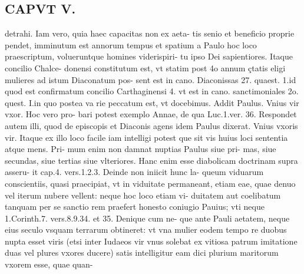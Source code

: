 \documentclass{article}
\begin{document}
\begin{pages}
\section*{CAPVT  V. }
\marginpar{[ p.27 ]}\pstart detrahi. Iam vero, quia haec capacitas non ex aeta- tis senio et beneficio proprie pendet, imminutum est annorum tempus et spatium a Paulo hoc loco praescriptum, volueruntque homines viderispiri- tu ipso Dei sapientiores. Itaque concilio Chalce- donensi constitutum est, vt statim post 4o annum çtatis eligi mulieres ad istum Diaconatum pos- sent est in cano. Diaconissas 27. quaest. 1.id quod est confirmatum concilio Carthaginensi 4. vt est in cano. sanctimoniales 2o. quest. I.in quo postea va rie peccatum est, vt docebimus. Addit Paulus. Vnius vir vxor. Hoc vero pro- bari potest exemplo Annae, de qua Luc.1.ver. 36. Respondet autem illi, quod de episcopis et Diaconis agens idem Paulus dixerat. Vnius vxoris vir. Itaque ex illo loco facile iam intelligi potest que sit vis huius loci sententia atque mens. Pri- mum enim non damnat nuptias Paulus siue pri- mas, siue secundas, siue tertias siue vlteriores. Hanc enim esse diabolicam doctrinam supra asseru- it cap.4. vers.1.2.3. Deinde non iniicit hunc la- queum viduarum conscientiis, quasi praecipiat, vt in viduitate permaneant, etiam eae, quae denuo vel iterum nubere vellent: neque hoc loco etiam vi- duitatem aut coelibatum tanquam per se sanctio rem praefert honesto coniugio Pauius; vti neque 1.Corinth.7. vers.8.9.34. et 35. Denique cum ne- que ante Pauli aetatem, neque eius seculo vsquam terrarum obtineret: vt vna mulier eodem tempo re duobus nupta esset viris (etsi inter Iudaeos vir vnus solebat ex vitiosa patrum imitatione duas vel plures vxores ducere) satis intelligitur eam dici plurium maritorum vxorem esse, quae quan-  \pend

\end{pages}
\end{document}
